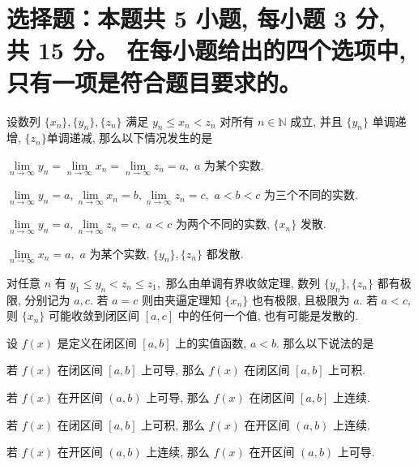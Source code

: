 \fi



\section{%
  选择题：本题共 5 小题, 每小题 3 分, 共 15 分。
  在每小题给出的四个选项中, 只有一项是符合题目要求的。
}

\begin{question}
设数列 $\{x_n\}, \{y_n\}, \{z_n\}$ 满足 $y_n \leqslant x_n < z_n$ 对所有 $n \in \mathbb{N}$ 成立, 并且 $\{y_n\}$ 单调递增, $\{z_n\}$单调递减, 那么以下情况发生的是 \paren[D]

\begin{choices}
\item $\lim\limits_{n\to\infty} y_n = \lim\limits_{n\to\infty} x_n = \lim\limits_{n\to\infty} z_n = a,$ $a$ 为某个实数.
\item $\lim\limits_{n\to\infty} y_n = a, \lim\limits_{n\to\infty} x_n = b, \lim\limits_{n\to\infty} z_n = c,$ $a < b < c$ 为三个不同的实数.
\item $\lim\limits_{n\to\infty} y_n = a, \lim\limits_{n\to\infty} z_n = c,$ $a < c$ 为两个不同的实数, $\{x_n\}$ 发散.
\item $\lim\limits_{n\to\infty} x_n = a,$ $a$ 为某个实数, $\{y_n\}, \{z_n\}$ 都发散.
\end{choices}
\end{question}

\begin{solution}
对任意 $n$ 有 $y_1 \leqslant y_n < z_n \leqslant z_1,$ 那么由单调有界收敛定理, 数列 $\{y_n\}, \{z_n\}$ 都有极限, 分别记为 $a, c.$ 若 $a = c$ 则由夹逼定理知 $\{x_n\}$ 也有极限, 且极限为 $a.$ 若 $a < c,$ 则 $\{x_n\}$ 可能收敛到闭区间 $[a, c]$ 中的任何一个值, 也有可能是发散的.
\end{solution}


\begin{question}
设 $f(x)$ 是定义在闭区间 $[a, b]$ 上的实值函数, $a < b.$ 那么以下说法的是 \paren[A]

\begin{choices}
  \item 若 $f(x)$ 在闭区间 $[a, b]$ 上可导, 那么 $f(x)$ 在闭区间 $[a, b]$ 上可积.
  \item 若 $f(x)$ 在开区间 $(a, b)$ 上可导, 那么 $f(x)$ 在闭区间 $[a, b]$ 上连续.
  \item 若 $f(x)$ 在闭区间 $[a, b]$ 上可积, 那么 $f(x)$ 在开区间 $(a, b)$ 上连续.
  \item 若 $f(x)$ 在开区间 $(a, b)$ 上连续, 那么 $f(x)$ 在开区间 $(a, b)$ 上可导.
\end{choices}
\end{question}

